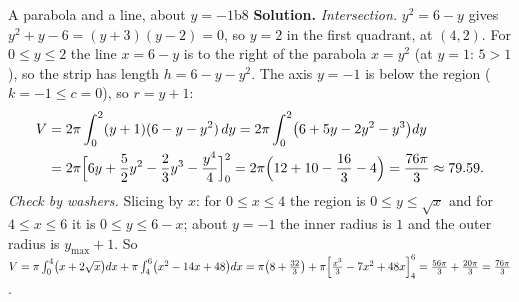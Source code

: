 \documentclass[11pt]{article}
\begin{document}
\begin{exmp}{A parabola and a line, about $y=-1$}{b8}
\textbf{Solution.} \emph{Intersection.} $y^2=6-y$ gives $y^2+y-6=(y+3)(y-2)=0$, so $y=2$ in the first quadrant, at $(4,2)$. For $0\le y\le2$ the line $x=6-y$ is to the right of the parabola $x=y^2$ (at $y=1$: $5>1$), so the strip has length $h=6-y-y^2$. The axis $y=-1$ is below the region ($k=-1\le c=0$), so $r=y+1$:
\[
\begin{aligned}V&=2\pi\int_0^2(y+1)(6-y-y^2)\,dy=2\pi\int_0^2\bigl(6+5y-2y^2-y^3\bigr)dy\\ &=2\pi\Bigl[6y+\frac52y^2-\frac23y^3-\frac{y^4}4\Bigr]_0^2=2\pi\Bigl(12+10-\frac{16}3-4\Bigr)=\frac{76\pi}3\approx79.59 .
\end{aligned}
\]
\emph{Check by washers.} Slicing by $x$: for $0\le x\le4$ the region is $0\le y\le\sqrt x$ and for $4\le x\le6$ it is $0\le y\le6-x$; about $y=-1$ the inner radius is $1$ and the outer radius is $y_{\max}+1$. So $V=\pi\int_0^4\bigl(x+2\sqrt x\bigr)dx+\pi\int_4^6\bigl(x^2-14x+48\bigr)dx=\pi\bigl(8+\frac{32}3\bigr)+\pi\Bigl[\frac{x^3}3-7x^2+48x\Bigr]_4^6=\frac{56\pi}3+\frac{20\pi}3=\frac{76\pi}3$.
\begin{center}
\end{center}
\end{exmp}
\end{document}
